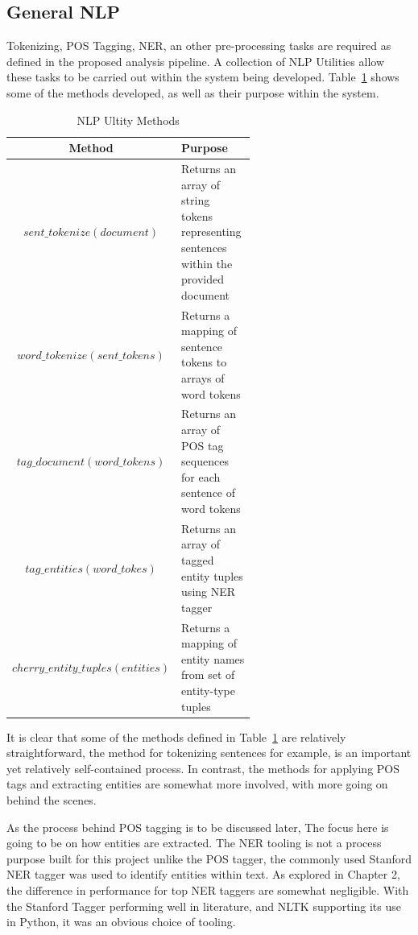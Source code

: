 \documentclass[10pt]{report}
\begin{document}
\subsection{General NLP}
Tokenizing, POS Tagging, NER, an other pre-processing tasks are required as defined in the proposed analysis pipeline. A collection of NLP Utilities allow these tasks to be carried out within the system being developed. Table~\ref{tab:nlp_utilities} shows some of the methods developed, as well as their purpose within the system. 

\renewcommand{\arraystretch}{2.0}
\renewcommand{\baselinestretch}{1.0}\normalsize
\begin{table}[h!]
  \begin{tabular}{c | p{0.6\linewidth} }
    Method & Purpose\\
    \hline
    $sent\_tokenize(document)$ & Returns an array of string tokens representing sentences within the provided document  \\
    $word\_tokenize(sent\_tokens)$& Returns a mapping of sentence tokens to arrays of word tokens \\
    $tag\_document(word\_tokens)$ & Returns an array of POS tag sequences for each sentence of word tokens\\
    $tag\_entities(word\_tokes)$ & Returns an array of tagged entity tuples using NER tagger\\
    $cherry\_entity\_tuples(entities)$ & Returns a mapping of entity names from set of entity-type tuples\\
  \end{tabular}
  \caption{NLP Ultity Methods\label{tab:nlp_utilities}}
\end{table}
\renewcommand{\baselinestretch}{2.0}\normalsize
\renewcommand{\arraystretch}{1.0}

It is clear that some of the methods defined in Table~\ref{tab:nlp_utilities} are relatively straightforward, the method for tokenizing sentences for example, is an important yet relatively self-contained process. In contrast, the methods for applying POS tags and extracting entities  are somewhat more involved, with more going on behind the scenes.

As the process behind POS tagging is to be discussed later, The focus here is going to be on how entities are extracted. The NER tooling is not a process purpose built for this project unlike the POS tagger, the commonly used Stanford NER tagger was used to identify entities within text. As explored in Chapter 2, the difference in performance for top NER taggers are somewhat negligible. With the Stanford Tagger performing well in literature, and NLTK supporting its use in Python, it was an obvious choice of tooling.
\end{document}
